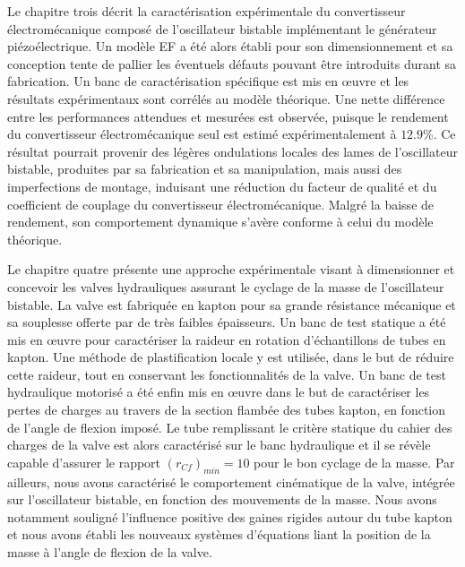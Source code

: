 Le chapitre trois décrit la caractérisation expérimentale du convertisseur électromécanique composé de l'oscillateur bistable implémentant le générateur piézoélectrique. Un modèle EF a été alors établi pour son dimensionnement et sa conception tente de pallier les éventuels défauts pouvant être introduits durant sa fabrication. Un banc de caractérisation spécifique est mis en \oe{}uvre et les résultats expérimentaux sont corrélés au modèle théorique. Une nette différence entre les performances attendues et mesurées est observée, puisque le rendement du convertisseur électromécanique seul est estimé expérimentalement à $12.9$\%. Ce résultat pourrait provenir des légères ondulations locales des lames de l'oscillateur bistable, produites par sa fabrication et sa manipulation, mais aussi des imperfections de montage, induisant une réduction du facteur de qualité et du coefficient de couplage du convertisseur électromécanique. Malgré la baisse de rendement, son comportement dynamique s'avère conforme à celui du modèle théorique.

Le chapitre quatre présente une approche expérimentale visant à dimensionner et concevoir les valves hydrauliques assurant le cyclage de la masse de l'oscillateur bistable. La valve est fabriquée en kapton pour sa grande résistance mécanique et sa souplesse offerte par de très faibles épaisseurs. Un banc de test statique a été mis en \oe{}uvre pour caractériser la raideur en rotation d'échantillons de tubes en kapton. Une méthode de plastification locale y est utilisée, dans le but de réduire cette raideur, tout en conservant les fonctionnalités de la valve. Un banc de test hydraulique motorisé a été enfin mis en \oe{}uvre dans le but de caractériser les pertes de charges au travers de la section flambée des tubes kapton, en fonction de l'angle de flexion imposé. Le tube remplissant le critère statique du cahier des charges de la valve est alors caractérisé sur le banc hydraulique et il se révèle capable d'assurer le rapport $(r_{Cf})_{min}=10$ pour le bon cyclage de la masse. Par ailleurs, nous avons caractérisé le comportement cinématique de la valve, intégrée sur l'oscillateur bistable, en fonction des mouvements de la masse. Nous avons notamment souligné l'influence positive des gaines rigides autour du tube kapton et nous avons établi les nouveaux systèmes d'équations liant la position de la masse à l'angle de flexion de la valve. 

